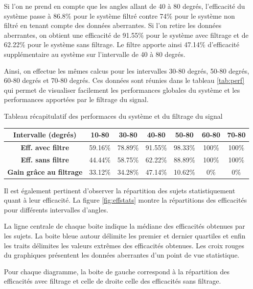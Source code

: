 \documentclass[letterpaper, twoside, 12pt, memoire, creativecommons, hyperref]{thETS}
\begin{document}
Si l'on ne prend en compte que les angles allant de 40 à 80 degrés, l'efficacité du système passe à 86.8\% pour le système filtré contre 74\% pour le système non filtré en tenant compte des données aberrantes. Si l'on retire les données aberrantes, on obtient une efficacité de 91.55\% pour le système avec filtrage et de 62.22\% pour le système sans filtrage. Le filtre apporte ainsi 47.14\% d'efficacité supplémentaire au système sur l'intervalle de 40 à 80 degrés.

Ainsi, on effectue les mêmes calcus pour les intervalles 30-80 degrés, 50-80 degrés, 60-80 degrés et 70-80 degrés. Ces données sont réunies dans le tableau \ref{tab:perf} qui permet de visualiser facilement les performances globales du système et les performances apportées par le filtrage du signal.

\begin{tableap}[*ht]
	\caption{Tableau récapitulatif des performaces du système et du filtrage du signal}
		\begin{tabular}{|c|c|c|c|c|c|c|}
		\hline
			{\bf Intervalle (degrés)} & {\bf 10-80} & {\bf 30-80} & {\bf 40-80} & {\bf 50-80} & {\bf 60-80} & {\bf 70-80} \\
	  \hline
			{\bf Eff. avec filtre} & 59.16\% & 78.89\% & 91.55\% & 98.33\% & 100\% & 100\% \\
	  \hline
			{\bf Eff. sans filtre} & 44.44\% & 58.75\% & 62.22\% & 88.89\% & 100\% & 100\% \\
	  \hline
			{\bf Gain grâce au filtrage} & 33.12\% & 34.28\% & 47.14\% & 10.62\% & 0\% & 0\% \\
	  \hline
		\end{tabular}
	\label{tab:perf}
\end{tableap}

Il est également pertinent d'observer la répartition des sujets statistiquement quant à leur efficacité. La figure \ref{fig:effstats} montre la répartitions des efficacités pour différents intervalles d'angles. 

La ligne centrale de chaque boite indique la médiane des efficacités obtenues par les sujets. La boite bleue autour délimite les premier et dernier quartiles et enfin les traits délimites les valeurs extrêmes des efficacités obtenues. Les croix rouges du graphiques présentent les données aberrantes d'un point de vue statistique.

Pour chaque diagramme, la boite de gauche correspond à la répartition des efficacités avec filtrage et celle de droite celle des efficacités sans filtrage.
\end{document}
